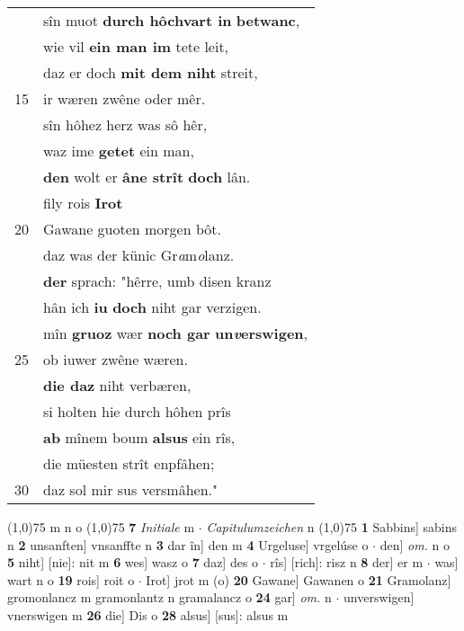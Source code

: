 \documentclass[8pt,a4paper,notitlepage]{article}
\begin{document}
\begin{table}[ht]
\begin{minipage}[t]{0.5\linewidth}
\begin{tabular}{rl}
 & sîn muot \textbf{durch hôchvart in} \textbf{betwanc},\\ 
 & wie vil \textbf{ein man im} tete leit,\\ 
 & daz er doch \textbf{mit dem niht} streit,\\ 
15 & ir wæren zwêne oder mêr.\\ 
 & sîn hôhez herz was sô hêr,\\ 
 & waz ime \textbf{getet} ein man,\\ 
 & \textbf{den} wolt er \textbf{âne strît} \textbf{doch} lân.\\ 
 & fily rois \textbf{Irot}\\ 
20 & Gawane guoten morgen bôt.\\ 
 & daz was der künic Gr\textit{a}m\textit{o}lanz.\\ 
 & \textbf{der} sprach: "hêrre, umb disen kranz\\ 
 & hân ich \textbf{iu} \textbf{doch} niht gar verzigen.\\ 
 & mîn \textbf{gruoz} wær \textbf{noch gar} \textbf{un\textit{v}erswigen},\\ 
25 & ob iuwer zwêne wæren.\\ 
 & \textbf{die daz} niht verbæren,\\ 
 & si holten hie durch hôhen prîs\\ 
 & \textbf{ab} mînem boum \textbf{alsus} ein rîs,\\ 
 & die müesten strît enpfâhen;\\ 
30 & daz sol mir sus versmâhen."\\ 
\end{tabular}
\scriptsize
\line(1,0){75} \newline
m n o \newline
\line(1,0){75} \newline
\textbf{7} \textit{Initiale} m   $\cdot$ \textit{Capitulumzeichen} n  \newline
\line(1,0){75} \newline
\textbf{1} Sabbins] sabins n \textbf{2} unsanften] vnsanffte n \textbf{3} dar în] den m \textbf{4} Urgeluse] vrgelúse o  $\cdot$ den] \textit{om.} n o \textbf{5} niht] [nie]: nit m \textbf{6} wes] wasz o \textbf{7} daz] des o  $\cdot$ rîs] [rich]: risz n \textbf{8} der] er m  $\cdot$ was] wart n o \textbf{19} rois] roit o  $\cdot$ Irot] jrot m (o) \textbf{20} Gawane] Gawanen o \textbf{21} Gramolanz] gromonlancz m gramonlantz n gramalancz o \textbf{24} gar] \textit{om.} n  $\cdot$ unverswigen] vnerswigen m \textbf{26} die] Dis o \textbf{28} alsus] [sus]: alsus m \newline
\end{minipage}
\end{table}
\end{document}
